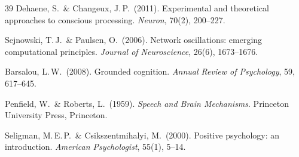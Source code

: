 ﻿\documentclass[12pt,a4paper]{report}
\theoremstyle{plain}
\theoremstyle{definition}
\theoremstyle{remark}
\begin{document}
\begin{thebibliography}{39}
		Dehaene, S.\ \& Changeux, J.\,P.\ (2011).
		Experimental and theoretical approaches to conscious processing.
		\textit{Neuron}, 70(2), 200--227.
		
		Sejnowski, T.\,J.\ \& Paulsen, O.\ (2006).
		Network oscillations: emerging computational principles.
		\textit{Journal of Neuroscience}, 26(6), 1673--1676.
		
		Barsalou, L.\,W.\ (2008).
		Grounded cognition.
		\textit{Annual Review of Psychology}, 59, 617--645.
		
		Penfield, W.\ \& Roberts, L.\ (1959).
		\textit{Speech and Brain Mechanisms}.
		Princeton University Press, Princeton.
		
		Seligman, M.\,E.\,P.\ \& Csikszentmihalyi, M.\ (2000).
		Positive psychology: an introduction.
		\textit{American Psychologist}, 55(1), 5--14.
		
	\end{thebibliography}
	
\end{document}
